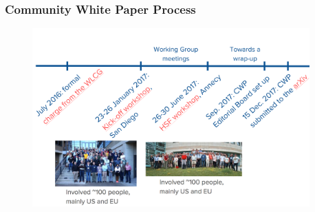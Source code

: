 \begin{frame}
\frametitle{Community White Paper Process}

\begin{figure}[htbp]
\begin{center}
\includegraphics[width=0.95\textwidth]{images/hsf-cwp-timeline.png}
\end{center}
\end{figure}


\end{frame}


